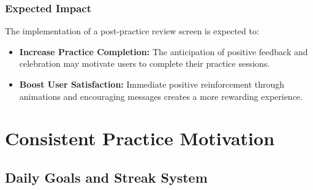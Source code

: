 \subsubsection{Expected Impact}

The implementation of a post-practice review screen is expected to:

\begin{itemize}
    \item \textbf{Increase Practice Completion:} The anticipation of positive feedback and celebration may motivate users to complete their practice sessions.
    
    \item \textbf{Boost User Satisfaction:} Immediate positive reinforcement through animations and encouraging messages creates a more rewarding experience.
\end{itemize}

\newpage

\section{Consistent Practice Motivation}
\label{sec:em-gamification-practice-motivation}

\subsection{Daily Goals and Streak System}
